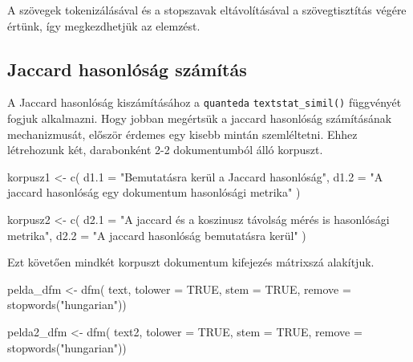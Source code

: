 \documentclass[
]{book}
\newenvironment{Shaded}{\begin{snugshade}}{\end{snugshade}}
\newcommand{\AttributeTok}[1]{\textcolor[rgb]{0.77,0.63,0.00}{#1}}
\newcommand{\ConstantTok}[1]{\textcolor[rgb]{0.00,0.00,0.00}{#1}}
\newcommand{\FunctionTok}[1]{\textcolor[rgb]{0.00,0.00,0.00}{#1}}
\newcommand{\NormalTok}[1]{#1}
\newcommand{\OtherTok}[1]{\textcolor[rgb]{0.56,0.35,0.01}{#1}}
\newcommand{\StringTok}[1]{\textcolor[rgb]{0.31,0.60,0.02}{#1}}
\begin{document}
A szövegek tokenizálásával és a stopszavak eltávolításával a
szövegtisztítás végére értünk, így megkezdhetjük az elemzést.

\hypertarget{jaccard-hasonluxf3suxe1g-szuxe1muxedtuxe1s-1}{%
\subsection{Jaccard hasonlóság
számítás}\label{jaccard-hasonluxf3suxe1g-szuxe1muxedtuxe1s-1}}

A Jaccard hasonlóság kiszámításához a \texttt{quanteda}
\texttt{textstat\_simil()} függvényét fogjuk alkalmazni. Hogy jobban
megértsük a jaccard hasonlóság számításának mechanizmusát, először
érdemes egy kisebb mintán szemléltetni. Ehhez létrehozunk két,
darabonként 2-2 dokumentumból álló korpuszt.

\begin{Shaded}
\begin{Highlighting}[]
\NormalTok{korpusz1 }\OtherTok{\textless{}{-}} \FunctionTok{c}\NormalTok{(}
  \AttributeTok{d1.1 =} \StringTok{"Bemutatásra kerül a Jaccard hasonlóság"}\NormalTok{,}
  \AttributeTok{d1.2 =} \StringTok{"A jaccard hasonlóság egy dokumentum hasonlósági metrika"}
\NormalTok{  )}


\NormalTok{korpusz2 }\OtherTok{\textless{}{-}} \FunctionTok{c}\NormalTok{(}
  \AttributeTok{d2.1 =} \StringTok{"A jaccard és a koszinusz távolság mérés is hasonlósági metrika"}\NormalTok{,}
  \AttributeTok{d2.2 =} \StringTok{"A jaccard hasonlóság bemutatásra kerül"}
\NormalTok{  )}
\end{Highlighting}
\end{Shaded}

Ezt követően mindkét korpuszt dokumentum kifejezés mátrixszá alakítjuk.

\begin{Shaded}
\begin{Highlighting}[]
\NormalTok{pelda\_dfm }\OtherTok{\textless{}{-}} \FunctionTok{dfm}\NormalTok{(}
\NormalTok{  text,}
  \AttributeTok{tolower =} \ConstantTok{TRUE}\NormalTok{, }\AttributeTok{stem =} \ConstantTok{TRUE}\NormalTok{,}
  \AttributeTok{remove =} \FunctionTok{stopwords}\NormalTok{(}\StringTok{"hungarian"}\NormalTok{))}

\NormalTok{pelda2\_dfm }\OtherTok{\textless{}{-}} \FunctionTok{dfm}\NormalTok{(}
\NormalTok{  text2,}
  \AttributeTok{tolower =} \ConstantTok{TRUE}\NormalTok{, }\AttributeTok{stem =} \ConstantTok{TRUE}\NormalTok{,}
  \AttributeTok{remove =} \FunctionTok{stopwords}\NormalTok{(}\StringTok{"hungarian"}\NormalTok{))}
\end{Highlighting}
\end{Shaded}
\end{document}
